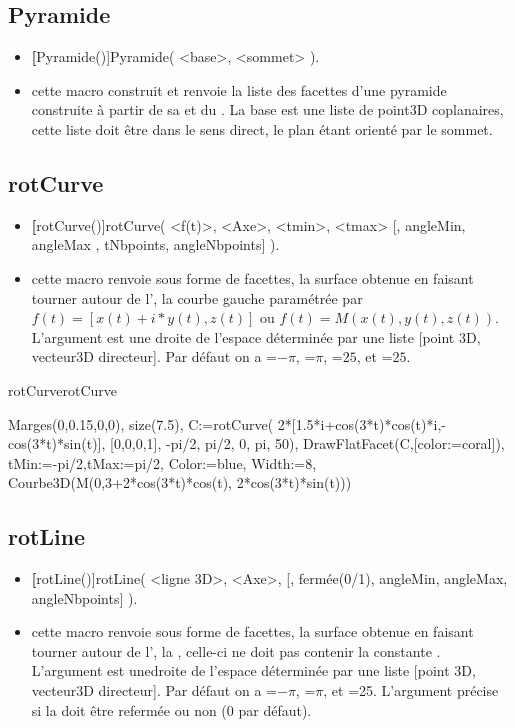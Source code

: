 \subsection{Pyramide}
\begin{itemize}
 \item \util \textbf[Pyramide()]{Pyramide( <base>, <sommet> )}.
 \item \desc cette macro construit et renvoie la liste des facettes d'une pyramide construite à partir de sa  et du . La base est une liste de point3D coplanaires, cette liste doit être dans le sens direct, le plan étant orienté par le sommet.
\end{itemize}

\subsection{rotCurve}
\begin{itemize}
 \item \util \textbf[rotCurve()]{rotCurve( <f(t)>, <Axe>, <tmin>, <tmax> [, angleMin, angleMax , tNbpoints,
angleNbpoints] )}.
 \item \desc cette macro renvoie sous forme de facettes, la surface obtenue en faisant tourner autour de l', la courbe gauche paramétrée par $f(t)=[x(t)+i*y(t), z(t)]$ ou $f(t)=M(x(t),y(t),z(t))$. L'argument  est une droite de l'espace déterminée par une liste [point 3D, vecteur3D directeur]. Par défaut on a =$-\pi$, =$\pi$, =$25$, et =$25$.
\end{itemize}

\begin{demo}{rotCurve}{rotCurve}
\begin{texgraph}[name=rotCurve]
Marges(0,0.15,0,0), size(7.5),
C:=rotCurve(
 2*[1.5*i+cos(3*t)*cos(t)*i,-cos(3*t)*sin(t)],
 [0,0,0,1], -pi/2, pi/2, 0, pi, 50),
DrawFlatFacet(C,[color:=coral]),
tMin:=-pi/2,tMax:=pi/2, Color:=blue,
Width:=8,
Courbe3D(M(0,3+2*cos(3*t)*cos(t),
     2*cos(3*t)*sin(t)))
\end{texgraph}
\end{demo}

\subsection{rotLine}
\begin{itemize}
 \item \util \textbf[rotLine()]{rotLine( <ligne 3D>, <Axe>, [, fermée(0/1), angleMin, angleMax, angleNbpoints] )}.
 \item \desc cette macro renvoie sous forme de facettes, la surface obtenue en faisant tourner autour de l', la , celle-ci ne doit pas contenir la constante \jump. L'argument  est unedroite de l'espace déterminée par une liste [point 3D, vecteur3D directeur]. Par défaut on a =$-\pi$, =$\pi$, et =25. L'argument  précise si la  doit être refermée ou non ($0$ par défaut).
\end{itemize}

